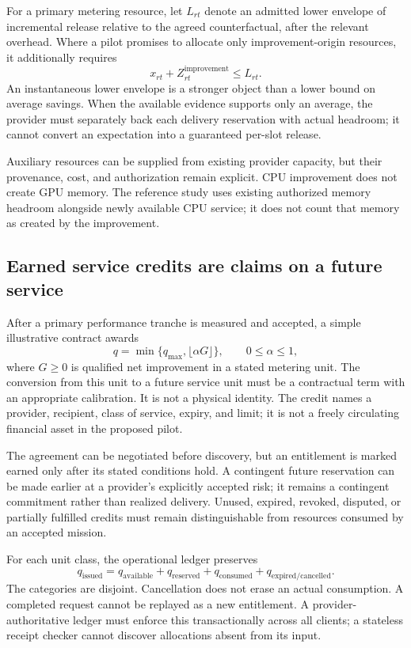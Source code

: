 \documentclass[11pt,letterpaper]{article}
\theoremstyle{remark}\newtheorem{remark}{Remark}[section]
\begin{document}
For a primary metering resource, let $L_{rt}$ denote an admitted lower envelope of incremental release relative to the agreed counterfactual, after the relevant overhead. Where a pilot promises to allocate only improvement-origin resources, it additionally requires
\begin{equation}\label{eq:incremental}
x_{rt}+Z^{\mathrm{improvement}}_{rt}\le L_{rt}.
\end{equation}
An instantaneous lower envelope is a stronger object than a lower bound on average savings. When the available evidence supports only an average, the provider must separately back each delivery reservation with actual headroom; it cannot convert an expectation into a guaranteed per-slot release.

Auxiliary resources can be supplied from existing provider capacity, but their provenance, cost, and authorization remain explicit. CPU improvement does not create GPU memory. The reference study uses existing authorized memory headroom alongside newly available CPU service; it does not count that memory as created by the improvement.

\subsection{Earned service credits are claims on a future service}
After a primary performance tranche is measured and accepted, a simple illustrative contract awards
\begin{equation}\label{eq:credit}
q=\min\{q_{\max},\lfloor\alpha G\rfloor\},\qquad 0\le\alpha\le1,
\end{equation}
where $G\ge0$ is qualified net improvement in a stated metering unit. The conversion from this unit to a future service unit must be a contractual term with an appropriate calibration. It is not a physical identity. The credit names a provider, recipient, class of service, expiry, and limit; it is not a freely circulating financial asset in the proposed pilot.

The agreement can be negotiated before discovery, but an entitlement is marked earned only after its stated conditions hold. A contingent future reservation can be made earlier at a provider's explicitly accepted risk; it remains a contingent commitment rather than realized delivery. Unused, expired, revoked, disputed, or partially fulfilled credits must remain distinguishable from resources consumed by an accepted mission.

For each unit class, the operational ledger preserves
\begin{equation}\label{eq:balance}
q_{\mathrm{issued}}=q_{\mathrm{available}}+q_{\mathrm{reserved}}+q_{\mathrm{consumed}}+q_{\mathrm{expired/cancelled}}.
\end{equation}
The categories are disjoint. Cancellation does not erase an actual consumption. A completed request cannot be replayed as a new entitlement. A provider-authoritative ledger must enforce this transactionally across all clients; a stateless receipt checker cannot discover allocations absent from its input.
\end{document}
